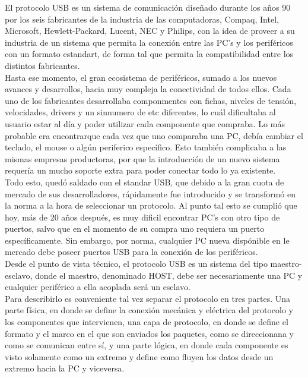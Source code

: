 El protocolo USB es un sistema de comunicación diseñado durante los años 90 por los seis fabricantes de la industria de las computadoras, Compaq, Intel, Microsoft, Hewlett-Packard, Lucent, NEC y Philips, con la idea de proveer a su industria de un sistema que permita la conexión entre las PC's y los periféricos con un formato estandart, de forma tal que permita la compatibilidad entre los distintos fabricantes.\\

Hasta ese momento, el gran ecosistema de periféricos, sumado a los nuevos avances y desarrollos, hacia muy compleja la conectividad de todos ellos. Cada uno de los fabricantes desarrollaba componmentes con fichas, niveles de tensión, velocidades, drivers y un sinnumero de etc diferentes, lo cuál dificultaba al usuario estar al día y poder utilizar cada componente que compraba. Lo más probable era encontrarque cada vez que uno comparaba una PC, debía cambiar el teclado, el mouse o algún periferico específico. Esto también complicaba a las mismas empresas productoras, por que la introducción de un nuevo sistema requería un mucho soporte extra para poder conectar todo lo ya existente.\\

Todo esto, quedó saldado con el standar USB, que debido a la gran cuota de mercado de sus desarrolladores, rápidamente fue introducido y se transformó en la norma a la hora de seleccionar un protocolo. Al punto tal esto se cumplió que hoy, más de 20 años después, es muy dificil encontrar PC's con otro tipo de puertos, salvo que en el momento de su compra uno requiera un puerto específicamente. Sin embargo, por norma, cualquier PC nueva dispónible en le mercado debe poseer puertos USB para la conexión de los periféricos.\\

Desde el punto de vista técnico, el protocolo USB es un sistema del tipo maestro-esclavo, donde el maestro, denominado HOST, debe ser necesariamente una PC y cualquier periférico a ella acoplada será un esclavo.\\

Para describirlo es conveniente tal vez separar el protocolo en tres partes. Una parte física, en donde se define la conexión mecánica y eléctrica del protocolo y los componentes que intervienen, una capa de protocolo, en donde se define el formato y el marco en el que son enviados los paquetes, como se direccionana y como se comunican entre sí, y una parte lógica, en donde cada componente es visto solamente como un extremo y define como fluyen los datos desde un extremo hacia la PC y viceversa.\\

